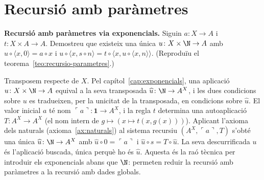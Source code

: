 \section{Recursió amb paràmetres}\label{prac:recursio-parametres}

\begin{exercici}
\textbf{Recursió amb paràmetres via exponencials.} Siguin \(a\colon X\to A\) i \(t\colon X\times A\to A\). Demostreu que existeix una única \(u\colon X\times\N\to A\) amb \(u\circ\langle x,0\rangle=a\circ x\) i \(u\circ\langle x,s\circ n\rangle=t\circ\langle x,u\circ\langle x,n\rangle\rangle\). (Reproduïu el teorema~\ref{teo:recursio-parametres}.)
\end{exercici}
\begin{solucio}
Transposem respecte de \(X\). Pel capítol~\ref{cap:exponencials}, una aplicació \(u\colon X\times\N\to A\) equival a la seva transposada \(\widehat u\colon\N\to A^{X}\), i les dues condicions sobre \(u\) es tradueixen, per la unicitat de la transposada, en condicions sobre \(\widehat u\). El valor inicial \(a\) té nom \(\ulcorner a\urcorner\colon\mathbf1\to A^{X}\), i la regla \(t\) determina una autoaplicació \(T\colon A^{X}\to A^{X}\) (el nom intern de \(g\mapsto(x\mapsto t(x,g(x)))\)). Aplicant l'axioma dels naturals (axioma~\ref{ax:naturals}) al sistema recursiu \((A^{X},\ulcorner a\urcorner,T)\) s'obté una única \(\widehat u\colon\N\to A^{X}\) amb \(\widehat u\circ0=\ulcorner a\urcorner\) i \(\widehat u\circ s=T\circ\widehat u\). La seva descurrificada \(u\) és l'aplicació buscada, única perquè ho és \(\widehat u\). Aquesta és la raó tècnica per introduir els exponencials abans que \(\N\): permeten reduir la recursió amb paràmetres a la recursió amb dades globals.
\end{solucio}
